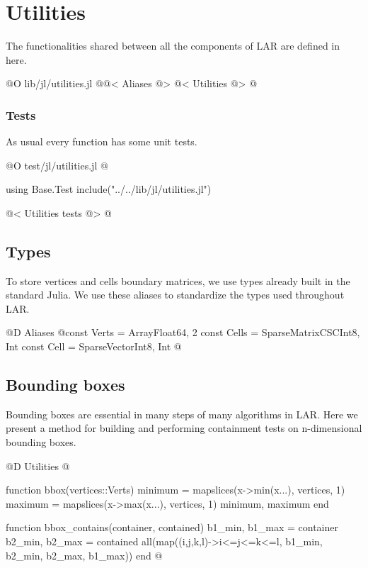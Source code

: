 \chapter{Utilities}
\label{ch:utilities}

The functionalities shared between all the components of LAR
are defined in here.

@O lib/jl/utilities.jl
@{@< Aliases @>
@< Utilities @>
@}

\subsection{Tests}
As usual every function has some unit tests.

@O test/jl/utilities.jl
@{using Base.Test
include("../../lib/jl/utilities.jl")

@< Utilities tests @>
@}


\section{Types}

To store vertices and cells boundary matrices, 
we use types already built in the standard Julia.
We use these aliases to standardize the types used 
throughout LAR. 

@D Aliases
@{const Verts = Array{Float64, 2}
const Cells = SparseMatrixCSC{Int8, Int}
const Cell = SparseVector{Int8, Int}
@}




\section{Bounding boxes}
\label{sec:bboxes}

Bounding boxes are essential in many steps of many
algorithms in LAR. Here we present a method for building
and performing containment tests on n-dimensional bounding boxes.

@D Utilities
@{function bbox(vertices::Verts)
    minimum = mapslices(x->min(x...), vertices, 1)
    maximum = mapslices(x->max(x...), vertices, 1)
    minimum, maximum
end

function bbox_contains(container, contained)
    b1_min, b1_max = container
    b2_min, b2_max = contained
    all(map((i,j,k,l)->i<=j<=k<=l, b1_min, b2_min, b2_max, b1_max))
end
@}

